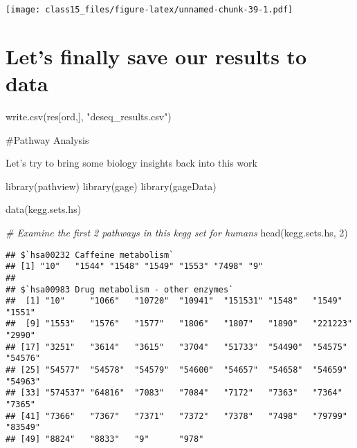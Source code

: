 \documentclass[
]{article}
\newenvironment{Shaded}{\begin{snugshade}}{\end{snugshade}}
\newcommand{\AttributeTok}[1]{\textcolor[rgb]{0.77,0.63,0.00}{#1}}
\newcommand{\CommentTok}[1]{\textcolor[rgb]{0.56,0.35,0.01}{\textit{#1}}}
\newcommand{\DecValTok}[1]{\textcolor[rgb]{0.00,0.00,0.81}{#1}}
\newcommand{\FunctionTok}[1]{\textcolor[rgb]{0.00,0.00,0.00}{#1}}
\newcommand{\NormalTok}[1]{#1}
\newcommand{\OtherTok}[1]{\textcolor[rgb]{0.56,0.35,0.01}{#1}}
\newcommand{\SpecialCharTok}[1]{\textcolor[rgb]{0.00,0.00,0.00}{#1}}
\newcommand{\StringTok}[1]{\textcolor[rgb]{0.31,0.60,0.02}{#1}}
\begin{document}
\begin{Shaded}
\end{Shaded}

\texttt{[image: class15\_files/figure-latex/unnamed-chunk-39-1.pdf]}

\hypertarget{lets-finally-save-our-results-to-data}{%
\section{Let's finally save our results to
data}\label{lets-finally-save-our-results-to-data}}

\begin{Shaded}
\begin{Highlighting}[]
\FunctionTok{write.csv}\NormalTok{(res[ord,], }\StringTok{"deseq\_results.csv"}\NormalTok{)}
\end{Highlighting}
\end{Shaded}

\#Pathway Analysis

Let's try to bring some biology insights back into this work

\begin{Shaded}
\begin{Highlighting}[]
\FunctionTok{library}\NormalTok{(pathview)}
\FunctionTok{library}\NormalTok{(gage)}
\FunctionTok{library}\NormalTok{(gageData)}

\FunctionTok{data}\NormalTok{(kegg.sets.hs)}

\CommentTok{\# Examine the first 2 pathways in this kegg set for humans}
\FunctionTok{head}\NormalTok{(kegg.sets.hs, }\DecValTok{2}\NormalTok{)}
\end{Highlighting}
\end{Shaded}

\begin{verbatim}
## $`hsa00232 Caffeine metabolism`
## [1] "10"   "1544" "1548" "1549" "1553" "7498" "9"   
## 
## $`hsa00983 Drug metabolism - other enzymes`
##  [1] "10"     "1066"   "10720"  "10941"  "151531" "1548"   "1549"   "1551"  
##  [9] "1553"   "1576"   "1577"   "1806"   "1807"   "1890"   "221223" "2990"  
## [17] "3251"   "3614"   "3615"   "3704"   "51733"  "54490"  "54575"  "54576" 
## [25] "54577"  "54578"  "54579"  "54600"  "54657"  "54658"  "54659"  "54963" 
## [33] "574537" "64816"  "7083"   "7084"   "7172"   "7363"   "7364"   "7365"  
## [41] "7366"   "7367"   "7371"   "7372"   "7378"   "7498"   "79799"  "83549" 
## [49] "8824"   "8833"   "9"      "978"
\end{verbatim}
\end{document}
